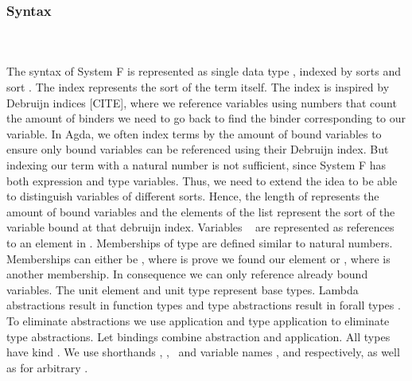 \subsubsection{Syntax}\hfill\\\\
The syntax of System F is represented as single data type , indexed by sorts  and sort . 
The index  represents the sort of the term itself.
The index  is inspired by Debruijn indices [CITE], where we reference variables using numbers that count the amount of binders we need to go back to find the binder corresponding to our variable. 
In Agda, we often index terms by the amount of bound variables to ensure only bound variables can be referenced using their Debruijn index. 
But indexing our term with a natural number is not sufficient, since System F has both expression and type variables. 
Thus, we need to extend the idea to be able to distinguish variables of different sorts.
Hence, the length of  represents the amount of bound variables and the elements  of the list represent the sort of the variable bound at that debruijn index. 
\FTerm
Variables \  are represented as references    to an element in .
Memberships of type    are defined similar to natural numbers. 
Memberships can either be , where  is prove we found our element or  , where  is another membership. 
In consequence we can only reference already bound variables.
The unit element  and unit type  represent base types. Lambda abstractions   result in function types    and type abstractions   result in forall types  . 
To eliminate abstractions we use application    and type application    to eliminate type abstractions. 
Let bindings     combine abstraction and application. All types  have kind .
We use shorthands \FVar, \FExpr, \FType\ and variable names ,  and  respectively, as well as  for arbitrary   .

